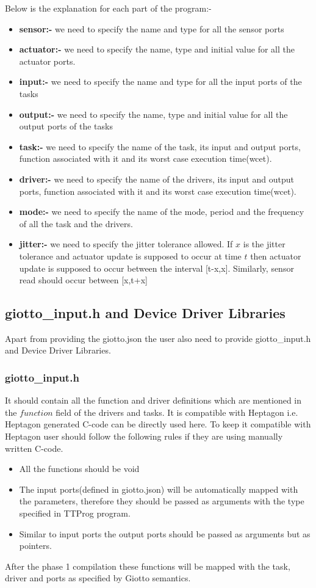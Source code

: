 \documentclass[16pt]{report}
\begin{document}
 Below is the explanation for each part of the program:-
\begin{itemize}
    \item \textbf{sensor:-} we need to specify the name and type for all the sensor ports
    \item \textbf{actuator:-} we need to specify the name, type and initial value for all the actuator ports.
    \item \textbf{input:-} we need to specify the name and type for all the input ports of the tasks
    \item \textbf{output:-} we need to specify the name, type and initial value for all the output ports of the tasks
    \item \textbf{task:-} we need to specify the name of the task, its input and output ports, function associated with it and its worst case execution time(wcet).
    \item \textbf{driver:-} we need to specify the name of the drivers, its input and output ports, function associated with it and its worst case execution time(wcet).
    \item \textbf{mode:-} we need to specify the name of the mode, period and the frequency of all the task and the drivers.
    \item \textbf{jitter:-} we need to specify the jitter tolerance allowed. If $x$ is the jitter tolerance and actuator update is supposed to occur at time $t$ then actuator update is supposed to occur between the interval [t-x,x]. Similarly, sensor read should occur between [x,t+x]
\end{itemize}


\subsection{giotto\_input.h and Device Driver Libraries}
Apart from providing the giotto.json the user also need to provide giotto\_input.h and Device Driver Libraries.

\subsubsection{giotto\_input.h}
It should contain all the function and driver definitions which are mentioned in the $function$ field of the drivers and tasks. It is compatible with Heptagon i.e. Heptagon generated C-code can be directly used here. To keep it compatible with Heptagon user should follow the following rules if they are using manually written C-code.
\begin{itemize}
    \item All the functions should be void
    \item The input ports(defined in giotto.json) will be automatically mapped with the parameters, therefore they should be passed as arguments with the type specified in TTProg program.
    \item Similar to input ports the output ports should be passed as arguments but as pointers.
\end{itemize}
After the phase 1 compilation these functions will be mapped with the task, driver and ports as specified by Giotto semantics.
\end{document}
